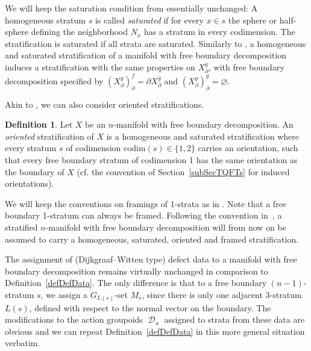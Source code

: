 \documentclass[pdftex]{sigma}
\DeclareMathOperator{\cald}{\mathcal{D}}
\numberwithin{equation}{section}
\theoremstyle{definition}
\newtheorem{Definition}[Definition]{Definition}
\begin{document}
We will keep the saturation condition from \cite[Definition~3.7]{FMM} essentially unchanged: A homogeneous stratum $s$ is called \textit{saturated} if for every $x \in s$ the sphere or half-sphere defining the neighborhood $N_x$ has a stratum in every codimension. The stratification is saturated if all strata are saturated. Similarly to \cite[Lemma~3.8]{FMM}, a homogeneous and saturated stratification of a manifold with free boundary decomposition induces a stratification with the same properties on $X_{\partial}^g$, with free boundary decomposition specified by $(X_{\partial}^g)_{\partial}^f = \partial X_{\partial}^g$ and $(X_{\partial}^g)_{\partial}^g = \varnothing$.

Akin to \cite[Definition 3.9]{FMM}, we can also consider oriented stratifications.
\begin{Definition}
 \label{defFBOrStr}
 Let $X$ be an $n$-manifold with free boundary decomposition. An \textit{oriented} stratification of $X$ is a homogeneous and saturated stratification where every stratum $s$ of codimension $\mathrm{codim}(s) \in \{1, 2\}$ carries an orientation, such that every free boundary stratum of codimension 1 has the same orientation as the boundary of $X$ (cf. the convention of Section~\ref{subSecTQFTs} for induced orientations).
\end{Definition}
We will keep the conventions on framings of 1-strata as in \cite[Definition~3.10]{FMM}. Note that a free boundary 1-stratum can always be framed.
Following the convention in~\cite{FMM}, a stratified $n$-manifold with free boundary decomposition will from now on be assumed to carry a homogeneous, saturated, oriented and framed stratification.

The assignment of (Dijkgraaf--Witten type) defect data to a manifold with free boundary decomposition remains virtually unchanged in comparison to Definition~\ref{defDefData}. The only difference is that to a free boundary $(n-1)$-stratum $s$, we assign a $G_{L(s)}$-set $M_s$, since there is only one adjacent 3-stratum $L(s)$, defined with respect to the normal vector on the boundary. The modifications to the action groupoids $\cald_u$ assigned to strata from these data are obvious and we can repeat Definition~\ref{defDefData} in this more general situation verbatim.
\end{document}
